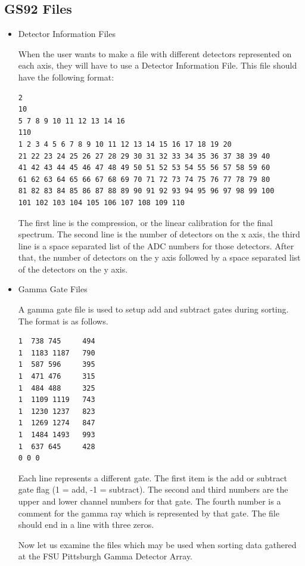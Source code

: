 \subsection{GS92 Files}
\begin{itemize}
\item{Detector Information Files}

When the user wants to make a file with different detectors represented on each axis, they will have to use a Detector Information File.  This file should have the following format:
\begin{verbatim}
2
10
5 7 8 9 10 11 12 13 14 16
110 
1 2 3 4 5 6 7 8 9 10 11 12 13 14 15 16 17 18 19 20
21 22 23 24 25 26 27 28 29 30 31 32 33 34 35 36 37 38 39 40
41 42 43 44 45 46 47 48 49 50 51 52 53 54 55 56 57 58 59 60
61 62 63 64 65 66 67 68 69 70 71 72 73 74 75 76 77 78 79 80
81 82 83 84 85 86 87 88 89 90 91 92 93 94 95 96 97 98 99 100
101 102 103 104 105 106 107 108 109 110
\end{verbatim}
The first line is the compression, or the linear calibration for the final spectrum.  The second line is the number of detectors on the x axis, the third line is a space separated list of the ADC numbers for those detectors.  After that, the number of detectors on the y axis followed by a space separated list of the detectors on the y axis.

\item{Gamma Gate Files}

A gamma gate file is used to setup add and subtract gates during sorting.  The format is as follows.

\begin{verbatim}
1  738 745     494
1  1183 1187   790
1  587 596     395
1  471 476     315
1  484 488     325
1  1109 1119   743
1  1230 1237   823
1  1269 1274   847
1  1484 1493   993
1  637 645     428
0 0 0
\end{verbatim}

Each line represents a different gate.  The first item is the add or subtract gate flag (1 = add, -1 = subtract).  The second and third numbers are the upper and lower channel numbers for that gate.  The fourth number is a comment for the gamma ray which is represented by that gate.  The file should end in a line with three zeros.


Now let us examine the files which may be used when sorting data gathered at the FSU Pittsburgh Gamma Detector Array.

\end{itemize}

